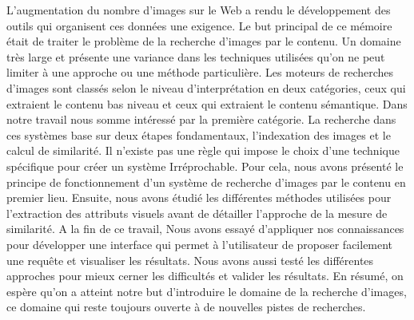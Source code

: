 \begin{center}
\end{center}
L’augmentation du nombre d’images sur le Web a rendu le développement
des outils qui organisent ces données une exigence. Le but principal de ce
mémoire était de traiter le problème de la recherche d’images par le contenu.
Un domaine très large et présente une variance dans les techniques utilisées
qu’on ne peut limiter à une approche ou une méthode particulière.
Les moteurs de recherches d’images sont classés selon le niveau
d'interprétation en deux catégories, ceux qui extraient le contenu bas niveau
et ceux qui extraient le contenu sémantique. Dans notre travail nous somme
intéressé par la première catégorie. La recherche dans ces systèmes base sur
deux étapes fondamentaux, l’indexation des images et le calcul de similarité.
Il n’existe pas une règle qui impose le choix d’une technique spécifique pour
créer un système Irréprochable. Pour cela, nous avons présenté le principe
de fonctionnement d’un système de recherche d’images par le contenu en
premier lieu. Ensuite, nous avons étudié les différentes méthodes utilisées
pour l’extraction des attributs visuels avant de détailler l’approche de la
mesure de similarité.
A la fin de ce travail, Nous avons essayé d’appliquer nos connaissances pour
développer une interface qui permet à l’utilisateur de proposer facilement
une requête et visualiser les résultats. Nous avons aussi testé les différentes
approches pour mieux cerner les difficultés et valider les résultats.
En résumé, on espère qu’on a atteint notre but d’introduire le domaine de la
recherche d’images, ce domaine qui reste toujours ouverte à de nouvelles
pistes de recherches.